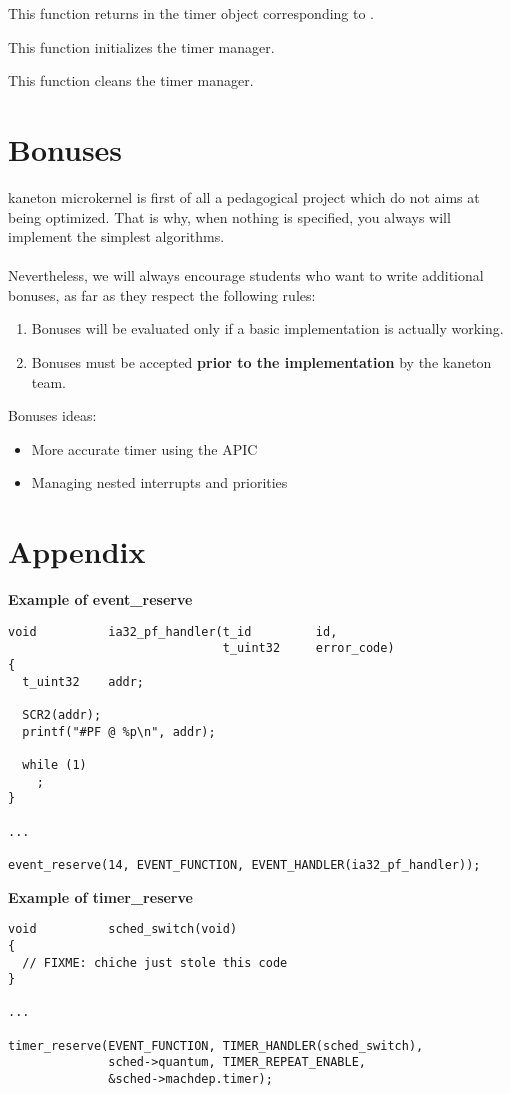	 {
	   This function returns in  the timer object
	   corresponding to .
	 }

	 {
	   This function initializes the timer manager.
	 }

	 {
	   This function cleans the timer manager.
	 }

%
%

\newpage

\section{Bonuses}

kaneton microkernel is first of all a pedagogical project which do not
aims at being optimized. That is why, when nothing is specified, you
always will implement the simplest algorithms.\\
\\
Nevertheless, we will always encourage students who want to write
additional bonuses, as far as they respect the following rules:

\begin{enumerate}
\item Bonuses will be evaluated only if a basic implementation is
  actually working.
\item Bonuses must be accepted \textbf{prior to the implementation}
  by the kaneton team.
\end{enumerate}

Bonuses ideas:
\begin{itemize}
\item More accurate timer using the APIC
\item Managing nested interrupts and priorities
\end{itemize}

%
%

\newpage

\section{Appendix}

\textbf{Example of event\_reserve}

\begin{verbatim}
void          ia32_pf_handler(t_id         id,
                              t_uint32     error_code)
{
  t_uint32    addr;

  SCR2(addr);
  printf("#PF @ %p\n", addr);

  while (1)
    ;
}

...

event_reserve(14, EVENT_FUNCTION, EVENT_HANDLER(ia32_pf_handler));
\end{verbatim}

\textbf{Example of timer\_reserve}

\begin{verbatim}
void          sched_switch(void)
{
  // FIXME: chiche just stole this code
}

...

timer_reserve(EVENT_FUNCTION, TIMER_HANDLER(sched_switch),
              sched->quantum, TIMER_REPEAT_ENABLE,
              &sched->machdep.timer);
\end{verbatim}
